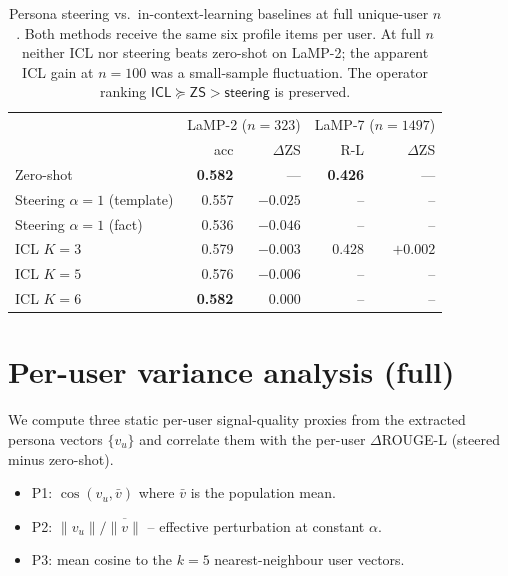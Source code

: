 \documentclass{article}
\begin{document}
\begin{table}[h]
\centering\small
\begin{tabular}{lrrrr}
\toprule
              & \multicolumn{2}{c}{LaMP-2 ($n{=}323$)} &
                \multicolumn{2}{c}{LaMP-7 ($n{=}1497$)} \\
              & acc           & $\Delta$ZS &
                R-L           & $\Delta$ZS \\
\midrule
Zero-shot     & \textbf{0.582} & ---       & \textbf{0.426} & ---       \\
Steering $\alpha{=}1$ (template)
              & 0.557          & $-0.025$  & --             & --        \\
Steering $\alpha{=}1$ (fact)
              & 0.536          & $-0.046$  & --             & --        \\
ICL $K{=}3$   & 0.579          & $-0.003$  & 0.428          & $+0.002$  \\
ICL $K{=}5$   & 0.576          & $-0.006$  & --             & --        \\
ICL $K{=}6$   & \textbf{0.582} & $0.000$   & --             & --        \\
\bottomrule
\end{tabular}
\caption{Persona steering vs.\ in-context-learning baselines at full
unique-user $n$.  Both methods receive the same six profile items per
user.  At full $n$ neither ICL nor steering beats zero-shot on LaMP-2;
the apparent ICL gain at $n{=}100$ was a small-sample fluctuation.
The operator ranking
$\textsf{ICL}\!\succeq\!\textsf{ZS}\!>\!\textsf{steering}$ is preserved.}
\label{tab:icl}
\end{table}

\section{Per-user variance analysis (full)}
\label{app:variance}
We compute three static per-user signal-quality proxies from the
extracted persona vectors $\{v_u\}$ and correlate them with the
per-user $\Delta$ROUGE-L (steered minus zero-shot).
\begin{itemize}
\item P1: $\cos(v_u, \bar v)$ where $\bar v$ is the population mean.
\item P2: $\|v_u\|/\overline{\|v\|}$ -- effective perturbation at
  constant $\alpha$.
\item P3: mean cosine to the $k{=}5$ nearest-neighbour user vectors.
\end{itemize}
\end{document}
